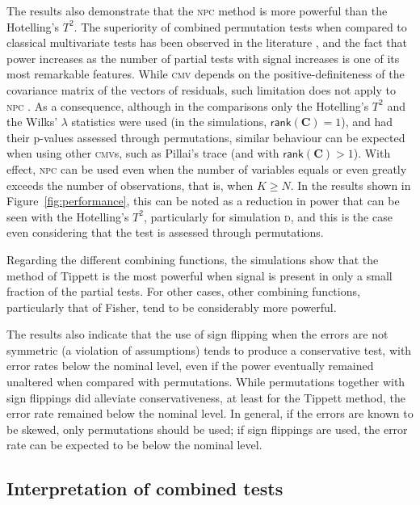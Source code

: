 The results also demonstrate that the \textsc{npc} method is more powerful than the Hotelling's $T^2$. The superiority of combined permutation tests when compared to classical multivariate tests has been observed in the literature \citep{Blair1994}, and the fact that power increases as the number of partial tests with signal increases is one of its most remarkable features. While \textsc{cmv} depends on the positive-definiteness of the covariance matrix of the vectors of residuals, such limitation does not apply to \textsc{npc} \citep{Pesarin2010_finite}. As a consequence, although in the comparisons only the Hotelling's $T^2$ and the Wilks' $\lambda$ statistics were used (in the simulations, $\mathsf{rank}\left(\mathbf{C}\right) = 1$), and had their p-values assessed through permutations, similar behaviour can be expected when using other \textsc{cmv}s, such as Pillai's trace (and with $\mathsf{rank}\left(\mathbf{C}\right) > 1$). With effect, \textsc{npc} can be used even when the number of variables equals or even greatly exceeds the number of observations, that is, when $K \geqslant N$. In the results shown in Figure~\ref{fig:performance}, this can be noted as a reduction in power that can be seen with the Hotelling's $T^2$, particularly for simulation \textsc{d}, and this is the case even considering that the test is assessed through permutations.

Regarding the different combining functions, the simulations show that the method of Tippett is the most powerful when signal is present in only a small fraction of the partial tests. For other cases, other combining functions, particularly that of Fisher, tend to be considerably more powerful.

The results also indicate that the use of sign flipping when the errors are not symmetric (a violation of assumptions) tends to produce a conservative test, with error rates below the nominal level, even if the power eventually remained unaltered when compared with permutations. While permutations together with sign flippings did alleviate conservativeness, at least for the Tippett method, the error rate remained below the nominal level. In general, if the errors are known to be skewed, only permutations should be used; if sign flippings are used, the error rate can be expected to be below the nominal level.

\subsection{Interpretation of combined tests}

